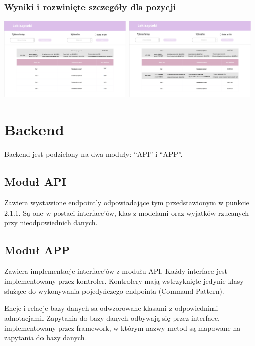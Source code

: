 \documentclass{article}
\begin{document}
      \subsubsection{Wyniki i rozwinięte szczegóły dla pozycji}
      \includegraphics[width=6.4cm, height=4cm]{lekizapteki-leki-identyczne}
      \includegraphics[width=6.4cm, height=4cm]{lekizapteki-leki-identyczne-rozwiniete}

  \section{Backend}
  Backend jest podzielony na dwa moduły: ``API'' i ``APP''.

    \subsection{Moduł API}
    Zawiera wystawione endpoint'y odpowiadające tym przedstawionym w punkcie 2.1.1.
    Są one w postaci interface'ów, klas z modelami oraz wyjatków rzucanych przy nieodpowiednich danych.

    \subsection{Moduł APP}
    Zawiera implementacje interface'ów z modułu API.
    Każdy interface jest implementowany przez kontroler.
    Kontrolery mają wstrzyknięte jedynie klasy służące do wykonywania pojedyńczego endpointa (Command Pattern).

    Encje i relacje bazy danych sa odwzorowane klasami z odpowiednimi adnotacjami.
    Zapytania do bazy danych odbywają się przez interface, implementowany przez framework,
    w którym nazwy metod są mapowane na zapytania do bazy danych.
\end{document}
